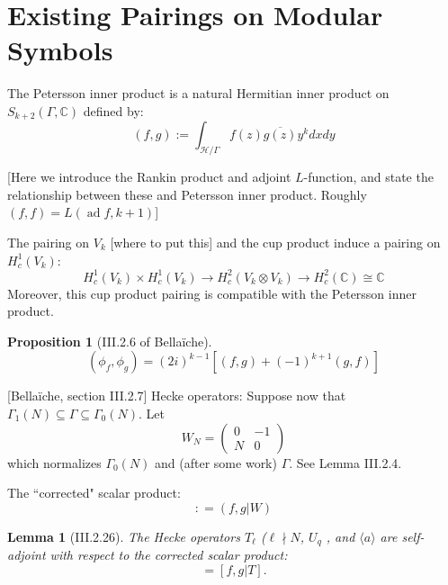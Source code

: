 \documentclass[10pt]{amsart}
\theoremstyle{plain}
\newtheorem{proposition}[theorem]{Proposition}
\newtheorem{lemma}[theorem]{Lemma}
\theoremstyle{definition}
\newcommand{\CC}{{\mathbb{C}}}
\newcommand{\cH}{\mathcal{H}}
\DeclareMathOperator{\ad}{ad}
\begin{document}
\section{Existing Pairings on Modular Symbols} \label{sec:existing_pairings}
The Petersson inner product is a natural Hermitian inner product on $S_{k+2}(\Gamma,\CC)$ defined by:
\begin{equation*}
	(f,g) := \int_{\cH/\Gamma} f(z) \overline{g(z)} y^{k} dx dy
\end{equation*}

[Here we introduce the Rankin product and adjoint $L$-function, and state the relationship between these and Petersson inner product. Roughly $(f,f)=L(\ad f,k+1)$]

The pairing on $V_k$ [where to put this] and the cup product induce a pairing on $H^1_c(V_k)$:
\begin{equation*}
	H^1_c(V_k)\times H^1_c(V_k) \longrightarrow H^2_c(V_k\otimes V_k)\longrightarrow H^2_c(\CC)\cong \CC
\end{equation*}
Moreover, this cup product pairing is compatible with the Petersson inner product.
\begin{proposition}[III.2.6 of Bella\"iche]
\begin{equation*}
	(\phi_f,\phi_g ) = (2i)^{k-1}[(f,g) + (-1)^{k+1} (g,f)]
\end{equation*}
\end{proposition}


[Bella\"iche, section III.2.7]
Hecke operators: Suppose now that $\Gamma_1(N)\subseteq \Gamma \subseteq \Gamma_0(N)$. Let 
\begin{equation}
	W_N = \begin{pmatrix} 0 & -1 \\ N & 0\end{pmatrix}
\end{equation}
which normalizes $\Gamma_0(N)$ and (after some work) $\Gamma$. See Lemma III.2.4.

The ``corrected" scalar product:
\begin{equation*}
	[f,g] : =(f,g|W)
\end{equation*}

\begin{lemma}[III.2.26]
The Hecke operators $T_\ell$ ($\ell\nmid N$, $U_q$ , and $\langle a \rangle$ are self-adjoint with respect to the corrected scalar product:
\begin{equation*}
	[f|T,g]=[f,g|T].
\end{equation*}	
\end{lemma}
\end{document}
